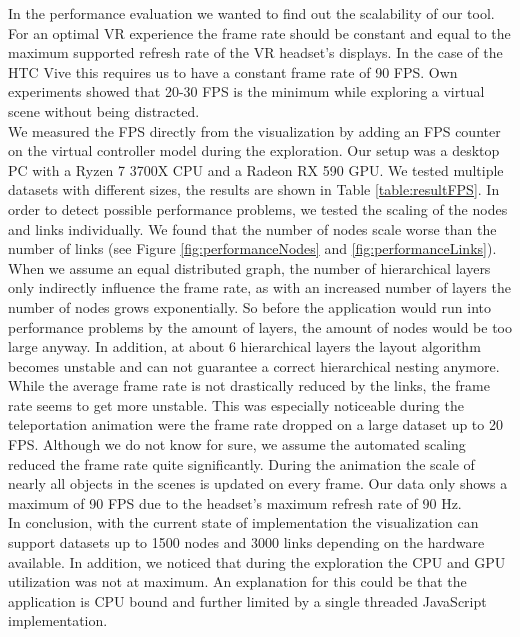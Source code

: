 In the performance evaluation we wanted to find out the scalability of our tool. 
For an optimal VR experience the frame rate should be constant and equal to the maximum supported refresh rate of the VR headset's displays. In the case of the HTC Vive this requires us to have a constant frame rate of 90 FPS.
Own experiments showed that 20-30 FPS is the minimum while exploring a virtual scene without being distracted.
\\
We measured the FPS directly from the visualization by adding an FPS counter on the virtual controller model during the exploration. Our setup was a desktop PC with a Ryzen 7 3700X CPU and a Radeon RX 590 GPU. 
We tested multiple datasets with different sizes, the results are shown in Table \ref{table:resultFPS}. 
In order to detect possible performance problems, we tested the scaling of the nodes and links individually.
We found that the number of nodes scale worse than the number of links (see Figure \ref{fig:performanceNodes} and \ref{fig:performanceLinks}). 
When we assume an equal distributed graph, the number of hierarchical layers only indirectly influence the frame rate, as with an increased number of layers the number of nodes grows exponentially. 
So before the application would run into performance problems by the amount of layers, the amount of nodes would be too large anyway. 
In addition, at about 6 hierarchical layers the layout algorithm becomes unstable and can not guarantee a correct hierarchical nesting anymore.
\\
While the average frame rate is not drastically reduced by the links, the frame rate seems to get more unstable. 
This was especially noticeable during the teleportation animation were the frame rate dropped on a large dataset up to 20 FPS. 
Although we do not know for sure, we assume the automated scaling reduced the frame rate quite significantly. During the animation the scale of nearly all objects in the scenes is updated on every frame.
Our data only shows a maximum of 90 FPS due to the headset's maximum refresh rate of 90 Hz.
\\
In conclusion, with the current state of implementation the visualization can support datasets up to 1500 nodes and 3000 links depending on the hardware available.
In addition, we noticed that during the exploration the CPU and GPU utilization was not at maximum. An explanation for this could be that the application is CPU bound and further limited by a single threaded JavaScript implementation.

